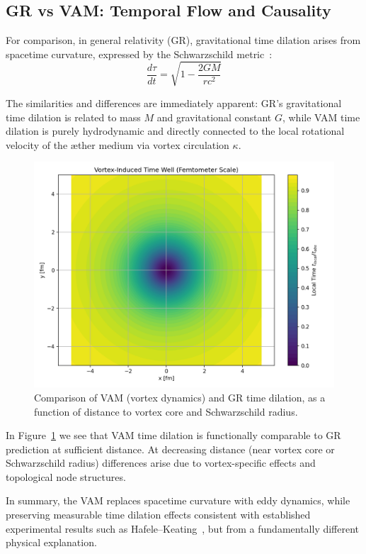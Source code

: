 \subsection{GR vs VAM: Temporal Flow and Causality}

For comparison, in general relativity (GR), gravitational time dilation arises from spacetime curvature, expressed by the Schwarzschild metric~\cite{schutz2009first}:
\begin{equation}\label{eq:GRtime}
\frac{d\tau}{dt} = \sqrt{1 - \frac{2GM}{rc^2}}
\end{equation}

The similarities and differences are immediately apparent: GR's gravitational time dilation is related to mass $M$ and gravitational constant $G$, while VAM time dilation is purely hydrodynamic and directly connected to the local rotational velocity of the æther medium via vortex circulation $\kappa$.

\begin{figure}[ht!]
    \centering
    \includegraphics[width=0.7\linewidth]{images/02-RadialProfileOfLocalTimeDilation_Vortex-Induced_Time_Well}
    \caption{Comparison of VAM (vortex dynamics) and GR time dilation, as a function of distance to vortex core and Schwarzschild radius.}
    \label{fig:compare_VAMGR}
\end{figure}

In Figure~\ref{fig:compare_VAMGR} we see that VAM time dilation is functionally comparable to GR prediction at sufficient distance. At decreasing distance (near vortex core or Schwarzschild radius) differences arise due to vortex-specific effects and topological node structures.

In summary, the VAM replaces spacetime curvature with eddy dynamics, while preserving measurable time dilation effects consistent with established experimental results such as Hafele–Keating~\cite{hafele1972around}, but from a fundamentally different physical explanation.

